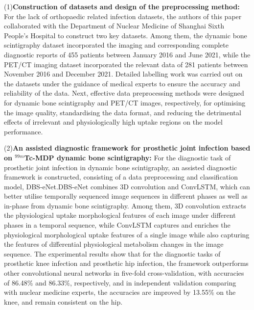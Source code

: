 \begin{eabstract}
    (1)\textbf{Construction of datasets and design of the preprocessing method: }For the lack of orthopaedic related infection datasets, the authors of this paper collaborated with the Department of Nuclear Medicine of Shanghai Sixth People's Hospital to construct two key datasets. Among them, the dynamic bone scintigraphy dataset incorporated the imaging and corresponding complete diagnostic reports of 455 patients between January 2016 and June 2021, while the PET/CT imaging dataset incorporated the relevant data of 281 patients between November 2016 and December 2021. Detailed labelling work was carried out on the datasets under the guidance of medical experts to ensure the accuracy and reliability of the data. Next, effective data preprocessing methods were designed for dynamic bone scintigraphy and PET/CT images, respectively, for optimising the image quality, standardising the data format, and reducing the detrimental effects of irrelevant and physiologically high uptake regions on the model performance.

    (2)\textbf{An assisted diagnostic framework for prosthetic joint infection based on \(^{99m}\)Tc-MDP dynamic bone scintigraphy: }For the diagnostic task of prosthetic joint infection in dynamic bone scintigraphy, an assisted diagnostic framework is constructed, consisting of a data preprocessing and classification model, DBS-eNet.DBS-eNet combines 3D convolution and ConvLSTM, which can better utilise temporally sequenced image sequences in different phases as well as in-phase from dynamic bone scintigraphy. Among them, 3D convolution extracts the physiological uptake morphological features of each image under different phases in a temporal sequence, while ConvLSTM captures and enriches the physiological morphological uptake features of a single image while also capturing the features of differential physiological metabolism changes in the image sequence. The experimental results show that for the diagnostic tasks of prosthetic knee infection and prosthetic hip infection, the framework outperforms other convolutional neural networks in five-fold cross-validation, with accuracies of 86.48\% and 86.33\%, respectively, and in independent validation comparing with nuclear medicine experts, the accuracies are improved by 13.55\% on the knee, and remain consistent on the hip.


\end{eabstract}
